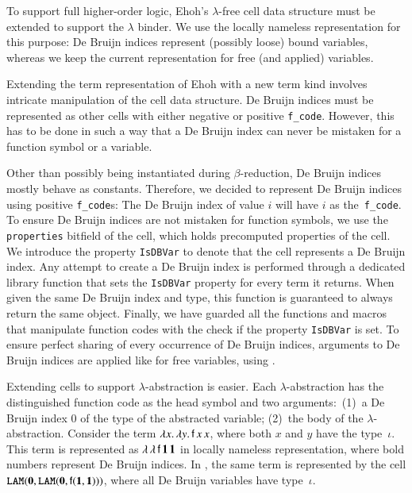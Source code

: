  To support full
higher-order logic, Ehoh's $\lambda$-free cell data structure must
be extended to support the $\lambda$ binder. We use the locally nameless
representation \cite{ac-12-locally-nameless} for this purpose: De Bruijn indices
represent (possibly loose) bound variables, whereas we keep the current
representation for free (and applied) variables.

Extending the term representation of Ehoh with a new term
kind involves intricate manipulation of the cell data structure. De Bruijn
indices must be represented as other cells with either negative or positive
\texttt{f\_code}. However, this has to be done in such a way that a De Bruijn
index can never be mistaken for a function symbol or a variable.

Other than possibly being instantiated during $\beta$-reduction, De Bruijn
indices mostly behave as constants. Therefore, we decided to represent De
Bruijn indices using positive \texttt{f\_code}s: The De Bruijn index of value $i$
will have $i$ as the~\verb|f_code|. To ensure De Bruijn indices are not
mistaken for function symbols, we use the \texttt{properties} bitfield of the
cell, which holds precomputed properties of %
the cell. We introduce the
property \texttt{IsDBVar} to denote that the cell represents a De
Bruijn index. Any attempt to create a De Bruijn index is performed through
a dedicated library function that sets the \texttt{IsDBVar} property for every term it
returns. When given the same De Bruijn index and type, this function is
guaranteed to always return the same object. Finally, we have guarded all the
functions and macros that manipulate function codes with the check if the
property \texttt{IsDBVar} is set. To ensure perfect sharing of every occurrence
of De Bruijn indices, arguments to De Bruijn indices are applied like for free
variables, using \internalat{}.

Extending cells to support $\lambda$-abstraction is easier. Each
$\lambda$-ab\-strac\-tion has the distinguished function code \internallam{} as the head
symbol and two arguments:\ (1)~a De Bruijn index 0 of the type of the abstracted variable;
(2)~the body %
of the $\lambda$-abstraction. Consider
the term $\lambda x. \, \lambda y.\, \mathsf{f}\, x \, x$, where both $x$ and $y$ have
the type~$\iota$. This term is represented as $\lambda\,\lambda\, \mathsf{f} \,
\mathbf{1} \, \mathbf{1}$ in locally nameless representation, where bold numbers
represent De Bruijn indices. In \ehohii{}, the same term is represented by the cell
$\texttt{LAM}(\mathbf{0}, \texttt{LAM}(\mathbf{0}, \mathsf{f}(\mathbf{1}, \mathbf{1})))$,
where all De Bruijn variables have type~$\iota$. 

